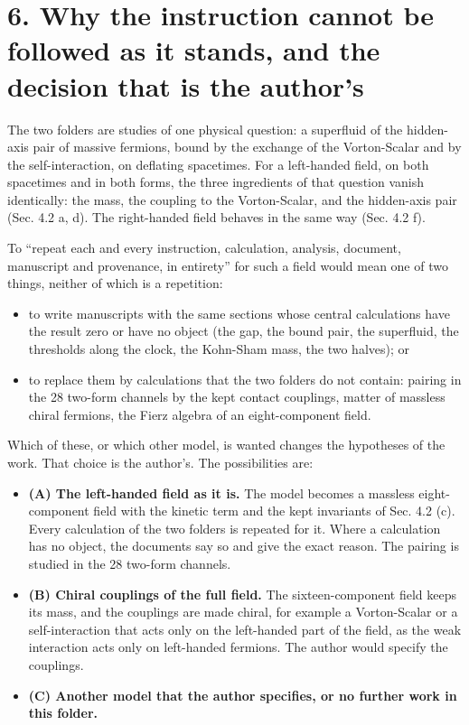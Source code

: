 \documentclass[
  10pt,
]{article}
\providecommand{\tightlist}{%
  \setlength{\itemsep}{0pt}\setlength{\parskip}{0pt}}
\begin{document}
\hypertarget{why-the-instruction-cannot-be-followed-as-it-stands-and-the-decision-that-is-the-authors}{%
\section{6. Why the instruction cannot be followed as it stands, and the
decision that is the
author's}\label{why-the-instruction-cannot-be-followed-as-it-stands-and-the-decision-that-is-the-authors}}

The two folders are studies of one physical question: a superfluid of
the hidden-axis pair of massive fermions, bound by the exchange of the
Vorton-Scalar and by the self-interaction, on deflating spacetimes. For
a left-handed field, on both spacetimes and in both forms, the three
ingredients of that question vanish identically: the mass, the coupling
to the Vorton-Scalar, and the hidden-axis pair (Sec. 4.2 a, d). The
right-handed field behaves in the same way (Sec. 4.2 f).

To ``repeat each and every instruction, calculation, analysis, document,
manuscript and provenance, in entirety'' for such a field would mean one
of two things, neither of which is a repetition:

\begin{itemize}
\tightlist
\item
  to write manuscripts with the same sections whose central calculations
  have the result zero or have no object (the gap, the bound pair, the
  superfluid, the thresholds along the clock, the Kohn-Sham mass, the
  two halves); or
\item
  to replace them by calculations that the two folders do not contain:
  pairing in the 28 two-form channels by the kept contact couplings,
  matter of massless chiral fermions, the Fierz algebra of an
  eight-component field.
\end{itemize}

Which of these, or which other model, is wanted changes the hypotheses
of the work. That choice is the author's. The possibilities are:

\begin{itemize}
\tightlist
\item
  \textbf{(A) The left-handed field as it is.} The model becomes a
  massless eight-component field with the kinetic term and the kept
  invariants of Sec. 4.2 (c). Every calculation of the two folders is
  repeated for it. Where a calculation has no object, the documents say
  so and give the exact reason. The pairing is studied in the 28
  two-form channels.
\item
  \textbf{(B) Chiral couplings of the full field.} The sixteen-component
  field keeps its mass, and the couplings are made chiral, for example a
  Vorton-Scalar or a self-interaction that acts only on the left-handed
  part of the field, as the weak interaction acts only on left-handed
  fermions. The author would specify the couplings.
\item
  \textbf{(C) Another model that the author specifies, or no further
  work in this folder.}
\end{itemize}
\end{document}
